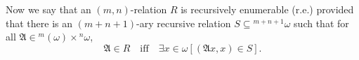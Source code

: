 Now we say that an $(m, n)$-relation $R$ is recursively enumerable (r.e.) provided that there is an $(m+n+1)$-ary recursive relation $S \subseteq {}^{m+n+1}\omega$ such that for all $\mathfrak{A} \in {}^m(\omega) \times {}^n\omega$,
$$\mathfrak{A} \in R \quad \text{iff} \quad \exists x \in \omega [(\mathfrak{A}x, x) \in S].$$